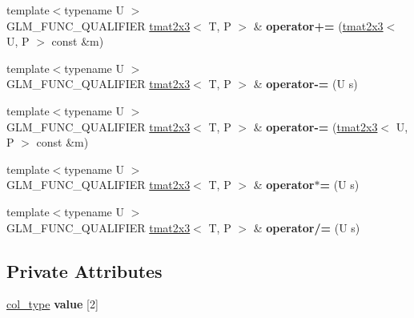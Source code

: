\begin{DoxyCompactItemize}
\item 
{\footnotesize template$<$typename U $>$ }\\G\+L\+M\+\_\+\+F\+U\+N\+C\+\_\+\+Q\+U\+A\+L\+I\+F\+I\+ER \hyperlink{structglm_1_1detail_1_1tmat2x3}{tmat2x3}$<$ T, P $>$ \& {\bfseries operator+=} (\hyperlink{structglm_1_1detail_1_1tmat2x3}{tmat2x3}$<$ U, P $>$ const \&m)\hypertarget{structglm_1_1detail_1_1tmat2x3_a5e17d74534e51b89fc4ef088fa42c867}{}\label{structglm_1_1detail_1_1tmat2x3_a5e17d74534e51b89fc4ef088fa42c867}

\item 
{\footnotesize template$<$typename U $>$ }\\G\+L\+M\+\_\+\+F\+U\+N\+C\+\_\+\+Q\+U\+A\+L\+I\+F\+I\+ER \hyperlink{structglm_1_1detail_1_1tmat2x3}{tmat2x3}$<$ T, P $>$ \& {\bfseries operator-\/=} (U s)\hypertarget{structglm_1_1detail_1_1tmat2x3_a9390f2064f9bdea63dc4e796822a42d4}{}\label{structglm_1_1detail_1_1tmat2x3_a9390f2064f9bdea63dc4e796822a42d4}

\item 
{\footnotesize template$<$typename U $>$ }\\G\+L\+M\+\_\+\+F\+U\+N\+C\+\_\+\+Q\+U\+A\+L\+I\+F\+I\+ER \hyperlink{structglm_1_1detail_1_1tmat2x3}{tmat2x3}$<$ T, P $>$ \& {\bfseries operator-\/=} (\hyperlink{structglm_1_1detail_1_1tmat2x3}{tmat2x3}$<$ U, P $>$ const \&m)\hypertarget{structglm_1_1detail_1_1tmat2x3_af1abd73945e5346e7ae1e5a953979aff}{}\label{structglm_1_1detail_1_1tmat2x3_af1abd73945e5346e7ae1e5a953979aff}

\item 
{\footnotesize template$<$typename U $>$ }\\G\+L\+M\+\_\+\+F\+U\+N\+C\+\_\+\+Q\+U\+A\+L\+I\+F\+I\+ER \hyperlink{structglm_1_1detail_1_1tmat2x3}{tmat2x3}$<$ T, P $>$ \& {\bfseries operator$\ast$=} (U s)\hypertarget{structglm_1_1detail_1_1tmat2x3_acb4473b53bf98d8330710d21fcfd9413}{}\label{structglm_1_1detail_1_1tmat2x3_acb4473b53bf98d8330710d21fcfd9413}

\item 
{\footnotesize template$<$typename U $>$ }\\G\+L\+M\+\_\+\+F\+U\+N\+C\+\_\+\+Q\+U\+A\+L\+I\+F\+I\+ER \hyperlink{structglm_1_1detail_1_1tmat2x3}{tmat2x3}$<$ T, P $>$ \& {\bfseries operator/=} (U s)\hypertarget{structglm_1_1detail_1_1tmat2x3_a98a33b4a96b4e55c24aee023e382eedd}{}\label{structglm_1_1detail_1_1tmat2x3_a98a33b4a96b4e55c24aee023e382eedd}

\end{DoxyCompactItemize}
\subsection*{Private Attributes}
\begin{DoxyCompactItemize}
\item 
\hyperlink{structglm_1_1detail_1_1tvec3}{col\+\_\+type} {\bfseries value} \mbox{[}2\mbox{]}\hypertarget{structglm_1_1detail_1_1tmat2x3_aee5bd11643d9f17469c2b11d0d65c97b}{}\label{structglm_1_1detail_1_1tmat2x3_aee5bd11643d9f17469c2b11d0d65c97b}

\end{DoxyCompactItemize}



